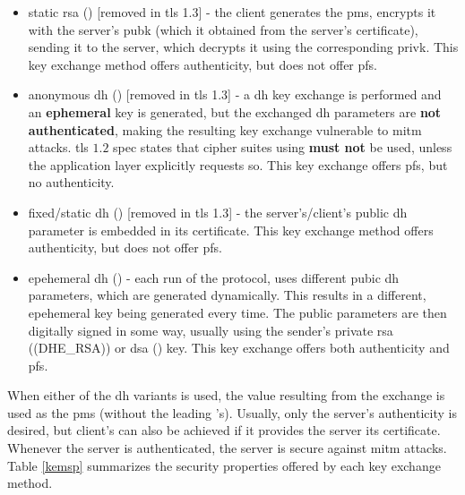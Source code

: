 \documentclass{llncs}
\begin{document}
\begin{itemize}
  \item static \gls{rsa} () [removed in \gls{tls} 1.3] - the client generates the \gls{pms}, encrypts it with the
  server's \gls{pubk} (which it obtained from the server's certificate),
  sending it to the server, which decrypts it using the corresponding \gls{privk}.
  This key exchange method offers authenticity, but does not offer \gls{pfs}.
  \item anonymous \gls{dh} () [removed in \gls{tls} 1.3] - a \gls{dh} key exchange is
  performed and an \textbf{ephemeral} key is generated, but the exchanged \gls{dh}
  parameters are \textbf{not authenticated}, making the resulting key exchange
  vulnerable to \gls{mitm} attacks. \gls{tls} $1.2$ spec states that cipher suites
  using  \textbf{must not} be used, unless the application
  layer explicitly requests so. This key exchange offers \gls{pfs}, but no
  authenticity.
  \item fixed/static \gls{dh} () [removed in \gls{tls} 1.3] - the server's/client's public \gls{dh} parameter
  is embedded in its certificate. This key exchange method offers authenticity,
  but does not offer \gls{pfs}.
  \item epehemeral \gls{dh} () - each run of the protocol, uses
  different pubic \gls{dh} parameters, which are generated dynamically. This results
  in a different, epehemeral key being generated every time. The public parameters
  are then digitally signed in some way, usually using the sender's private
  \gls{rsa} (\codeword(DHE_RSA)) or \gls{dsa} () key. This key
  exchange offers both authenticity and \gls{pfs}.
\end{itemize}

When either of the \gls{dh} variants is used, the value resulting from the exchange is used
as the \gls{pms} (without the leading 's). Usually, only the server's
authenticity is desired, but client's can also be achieved if it provides the
server its certificate. Whenever the server is authenticated, the server is secure
against \gls{mitm} attacks. Table \ref{kemsp} summarizes the security properties
offered by each key exchange method.
\end{document}
